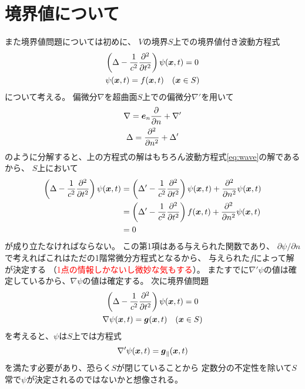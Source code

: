 \documentclass[a4paper, 10pt]{jsarticle}
\theoremstyle{definition}
\def\vec#1{\mbox{\boldmath $#1$}}
\newcommand{\pdif}[2]{\frac{\partial #1}{\partial #2}}
\begin{document}
\section{境界値について}
また境界値問題については初めに、
$V$の境界$S$上での境界値付き波動方程式
\begin{gather}
	\left( \Delta - \frac{1}{c^2} \pdif{^2}{t^2} \right) \psi(\vec{x}, t) = 0
	\label{eq:wave} \\
	\psi(\vec{x}, t) = f(\vec{x}, t) \quad (\vec{x} \in S)
\end{gather}
について考える。
偏微分$\nabla$を超曲面$S$上での偏微分$\nabla'$を用いて
\begin{gather}
	\nabla = \vec{e}_n \pdif{}{n} + \nabla' \\
	\Delta = \pdif{^2}{n^2} + \Delta'
\end{gather}
のように分解すると、上の方程式の解はもちろん波動方程式\eqref{eq:wave}の解であるから、
$S$上において
\begin{align}
	\left( \Delta - \frac{1}{c^2} \pdif{^2}{t^2} \right) \psi(\vec{x}, t)
	&= \left( \Delta' - \frac{1}{c^2} \pdif{^2}{t^2} \right) \psi(\vec{x}, t)
	+ \pdif{^2}{n^2} \psi(\vec{x}, t) \\
	&= \left( \Delta' - \frac{1}{c^2} \pdif{^2}{t^2} \right) f(\vec{x}, t)
	+ \pdif{^2}{n^2} \psi(\vec{x}, t) \\
	&= 0
\end{align}
が成り立たなければならない。
この第1項はある与えられた関数であり、
$\partial \psi / \partial n$で考えればこれはただの1階常微分方程式となるから、
与えられた$f$によって解が決定する
（\textcolor{red}{1点の情報しかないし微妙な気もする}）。
またすでに$\nabla' \psi$の値は確定しているから、$\nabla \psi$の値は確定する。
次に境界値問題
\begin{gather}
	\left( \Delta - \frac{1}{c^2} \pdif{^2}{t^2} \right) \psi(\vec{x}, t) = 0 \\
	\nabla \psi(\vec{x}, t) = \vec{g}(\vec{x}, t) \quad (\vec{x} \in S)
\end{gather}
を考えると、$\psi$は$S$上では方程式
\begin{align}
	\nabla' \psi(\vec{x}, t) = \vec{g}_{\parallel} (\vec{x}, t)
\end{align}
を満たす必要があり、恐らく$S$が閉じていることから
定数分の不定性を除いて$S$常で$\psi$が決定されるのではないかと想像される。
\end{document}
